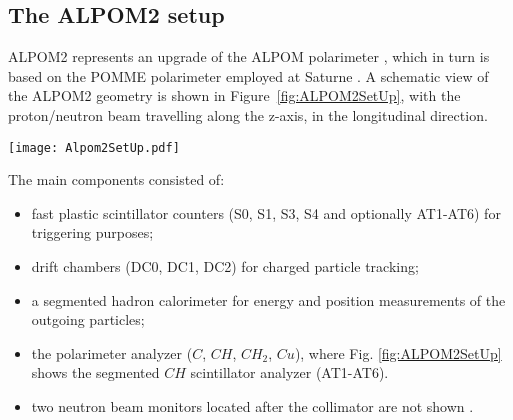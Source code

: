 \documentclass[epj]{svjour}
\begin{document}
\subsection{The ALPOM2 setup}

ALPOM2 represents an upgrade of the ALPOM polarimeter \cite{Azhgirey:2004yk}, which in turn is based on the POMME polarimeter employed at Saturne  \cite{Bonin:1989tg}.
A schematic view of the ALPOM2 geometry is shown in Figure~\ref{fig:ALPOM2SetUp}, with the proton/neutron beam travelling along the z-axis, in the longitudinal direction. 
\begin{figure*}
\centering
\texttt{[image: Alpom2SetUp.pdf]}
\caption{Side view schematic of the ALPOM2 set up positioned on the secondary proton/neutron beam line, including: scintillation counters (S0, S1, S3, S4); drift chambers (DC0, DC1, DC2); Hadron Calorimeter. The analyzing targets were located between DC0 and DC1. Here a $CH$ active target (AT1\,-\,AT6), is shown as an example. Dimensions are in mm. $\Theta$ indicates the origin of the $z$ coordinate.}
\label{fig:ALPOM2SetUp}
\end{figure*}
The main components consisted of:
\begin{itemize}
\item fast plastic scintillator counters (S0, S1, S3, S4 and optionally AT1-AT6) for triggering purposes;
\item drift chambers (DC0, DC1, DC2) for charged particle tracking;
\item a segmented hadron calorimeter for energy and position measurements of the outgoing particles;
\item the polarimeter analyzer ($C$, $CH$, $CH_2$, $Cu$), where Fig. \ref{fig:ALPOM2SetUp} shows the segmented $CH$ scintillator analyzer (AT1-AT6). 
\item two neutron beam monitors located after the collimator are not shown \cite{Lehar:1996cr}.
\end{itemize}
\end{document}

